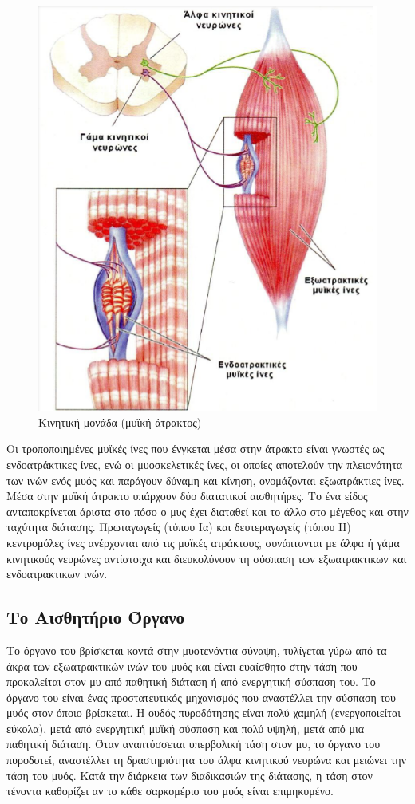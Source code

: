 \begin{figure}[H]
    \centering
    \includegraphics[width=.8\textwidth]{neuromusculoskeletal/fig/muscle-fysiology5.png}
    \caption{Κινητική μονάδα (μυϊκή άτρακτος)}
    \label{fig:muscle-fysiology5}
\end{figure}

Οι τροποποιημένες μυϊκές ίνες που ένγκεται μέσα στην άτρακτο είναι γνωστές ως ενδοατράκτικες ίνες, ενώ οι μυοσκελετικές ίνες, οι οποίες αποτελούν την πλειονότητα των ινών ενός μυός και παράγουν δύναμη και κίνηση, ονομάζονται εξωατράκτιες ίνες. Μέσα στην μυϊκή άτρακτο υπάρχουν δύο διατατικοί αισθητήρες. Το ένα είδος ανταποκρίνεται άριστα στο πόσο ο μυς έχει διαταθεί και το άλλο στο μέγεθος και στην ταχύτητα διάτασης. Πρωταγωγείς (τύπου Ια) και δευτεραγωγείς (τύπου ΙΙ) κεντρομόλες ίνες ανέρχονται από τις μυϊκές ατράκτους, συνάπτονται με άλφα ή γάμα κινητικούς νευρώνες αντίστοιχα και διευκολύνουν τη σύσπαση των εξωατρακτικων και ενδοατρακτικων ινών.

\subsection{\texorpdfstring{Το Αισθητήριο Όργανο }{}}

Το όργανο του  βρίσκεται κοντά στην μυοτενόντια σύναψη, τυλίγεται γύρω από τα άκρα των εξωατρακτικών ινών του μυός και είναι ευαίσθητο στην τάση που προκαλείται στον μυ από παθητική διάταση ή από ενεργητική σύσπαση του. Το όργανο του  είναι ένας προστατευτικός μηχανισμός που αναστέλλει την σύσπαση του μυός στον όποιο βρίσκεται. Η ουδός πυροδότησης είναι πολύ χαμηλή (ενεργοποιείται εύκολα), μετά από ενεργητική μυϊκή σύσπαση και πολύ υψηλή, μετά από μια παθητική διάταση. Όταν αναπτύσσεται υπερβολική τάση στον μυ, το όργανο του  πυροδοτεί, αναστέλλει τη δραστηριότητα του άλφα κινητικού νευρώνα και μειώνει την τάση του μυός. Κατά την διάρκεια των διαδικασιών της διάτασης, η τάση στον τένοντα καθορίζει αν το κάθε σαρκομέριο του μυός είναι επιμηκυμένο.

